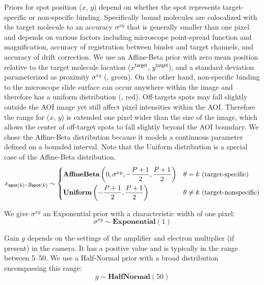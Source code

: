 Priors for spot position ($x$, $y$) depend on whether the spot represents target-specific or non-specific binding. Specifically bound molecules are colocalized with the target molecule to an accuracy $\sigma^{xy}$ that is generally smaller than one pixel and depends on various factors including microscope point-spread function and magnification, accuracy of registration between binder and target channels, and accuracy of drift correction. We use an Affine-Beta prior with zero mean position relative to the target molecule location ($x^\mathsf{target}$, $y^\mathsf{target}$), and a standard deviation parameterized as proximity $\sigma^{xy} $ (, green). On the other hand, non-specific binding to the microscope slide surface can occur anywhere within the image and therefore has a uniform distribution (, red).  Off-targets spots may fall slightly outside the AOI image yet still affect pixel intensities within the AOI.  Therefore the range for ($x$, $y$) is extended one pixel wider than the size of the image, which allows the center of off-target spots to fall slightly beyond the AOI boundary. We chose the Affine-Beta distribution because it models a continuous parameter defined on a bounded interval. Note that the Uniform distribution is a special case of the Affine-Beta distribution.
%
\begin{equation}
    x_{\mathsf{spot}(k)}, y_{\mathsf{spot}(k)} \sim
    \begin{cases}
        \mathbf{AffineBeta}\left( 0, \sigma^{xy}, -\dfrac{P+1}{2}, \dfrac{P+1}{2} \right) & \theta = k ~\text{(target-specific)} \\
        \mathbf{Uniform}\left(-\dfrac{P+1}{2}, \dfrac{P+1}{2} \right) & \theta \neq k ~\text{(target-nonspecific)} \rule{0pt}{4ex}
    \end{cases}
\end{equation}

We give $\sigma^{xy}$ an Exponential prior with a characteristic width of one pixel:
%
\begin{equation}
    \sigma^{xy} \sim \mathbf{Exponential}(1)
\end{equation}

Gain $g$ depends on the settings of the amplifier and electron multiplier (if present) in the camera. It has a positive value and is typically in the range between 5--50. We use a Half-Normal prior with a broad distribution encompassing this range:
%
\begin{equation}
    g \sim \mathbf{HalfNormal}(50)
\end{equation}

